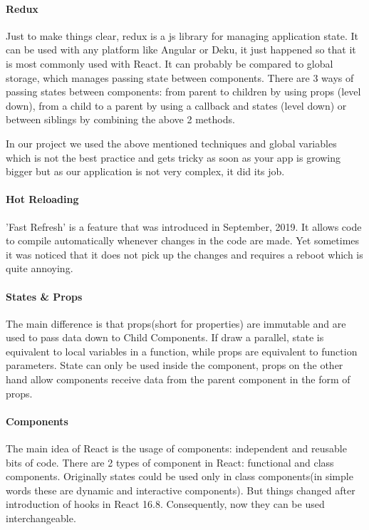 \paragraph{Redux}
Just to make things clear, redux is a js library for managing application state.
It can be used with any platform like Angular or Deku, it just happened so that it is most commonly used with React.
It can probably be compared to global storage, which manages passing state between components.
There are 3 ways of passing states between components: from parent to children by using props (level down), from a child to a parent by using a callback and states (level down) or between siblings by combining the above 2 methods.

In our project we used the above mentioned techniques and global variables which is not the best practice and gets tricky as soon as your app is growing bigger but as our application is not very complex, it did its job.


\paragraph{Hot Reloading}
'Fast Refresh' is a feature that was introduced in September, 2019.
It allows code to compile automatically whenever changes in the code are made. 
Yet sometimes it was noticed that it does not pick up the changes and requires a reboot which is quite annoying.


\paragraph{ States \& Props }
The main difference is that props(short for properties) are immutable and are used to pass data down to Child Components. 
If draw a parallel, state is equivalent to local variables in a function, while props are equivalent to function parameters.
State can only be used inside the component, props on the other hand allow components receive data from the parent component in the form of props.

\paragraph{Components}
The main idea of React is the usage of components: independent and reusable bits of code.
There are 2 types of component in React: functional and class components. Originally states could be used only in class components(in simple words these are dynamic and interactive components). But things changed after introduction of hooks in React 16.8. Consequently, now they can be used interchangeable.

